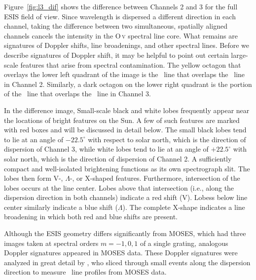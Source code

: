     	Figure~\ref{fig:l3_dif} shows the difference between Channels 2 and 3 for the full ESIS field of view.  
    	Since wavelength is dispersed a different direction in each channel, taking the difference between two
    	simultaneous, spatially aligned channels cancels the intensity in the O\,\textsc{v} spectral line core. 
    	What remains are signatures of Doppler shifts, line broadenings, and other spectral lines.
    	Before we describe signatures of Doppler shift, it may be helpful to point out certain large-scale features that arise from spectral contamination.
    	The %
    	yellow octagon that overlays the lower left quadrant of the image is the \mgxbright \ line that overlaps the \ov \ line in Channel 2. Similarly, a dark octagon on the lower right quadrant is the portion of the \mgxbright \ line that overlaps the \ov \ line in Channel 3.
    	
    	
    	In the difference image,
    	Small-scale black and white lobes frequently appear near the locations of bright features on the Sun. A few of such features are marked with red boxes and will be discussed in detail below.  
    	The small black lobes tend to lie at an angle of $-22.5^\circ$ with respect to solar north, which is the direction of dispersion of Channel 3, while white lobes tend to lie at an angle of $+22.5^\circ$ with solar north, which is the direction of dispersion of Channel 2. A sufficiently compact and well-isolated brightening functions as its own spectrograph slit. 
    	The lobes then form V-, $\Lambda$-, or X-shaped features. %
    	Furthermore, intersection of the lobes occurs at the line center. Lobes above that intersection (i.e., along the dispersion direction in both channels) indicate a red shift (V). Lobess below line center similarly indicate a blue shift ($\Lambda$). The complete X-shape indicates a line broadening in which both red and blue shifts are present.
    	
    	Although the ESIS geometry differs significantly from MOSES, which had three images taken at spectral orders $m=-1, 0, 1$
    	of a single grating, analogous Doppler signatures appeared in MOSES data. These Doppler signatures were analyzed in great detail by \citet{Rust2019}, who sliced through small events along the dispersion direction to measure \heii \ line profiles from MOSES data.
    	    
